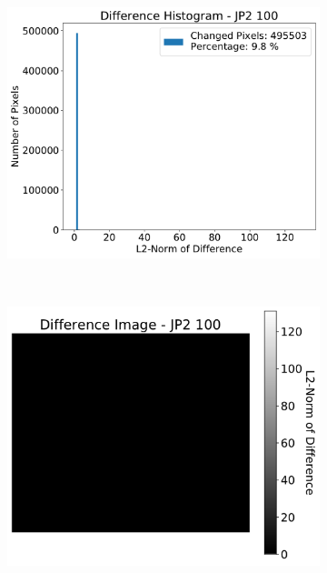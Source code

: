 \begin{figure}[htb]
\begin{subfigure}[b]{0.48\textwidth}
        \includegraphics[width=\textwidth]{doc/thesis/0_figures/compare_quality/set1/jp2_100_diff_histogram}
        \caption{}
        \label{fig:img_quality_comp_jp2_100_histo}
    \end{subfigure}
    \\
    \begin{subfigure}[b]{0.48\textwidth}
        \centering
        \includegraphics[width=\textwidth]{doc/thesis/0_figures/compare_quality/set1/jp2_100_diff_heatmap}
        \caption{}
        \label{fig:img_quality_comp_jp2_100_diff}
    \end{subfigure}

\end{figure}
